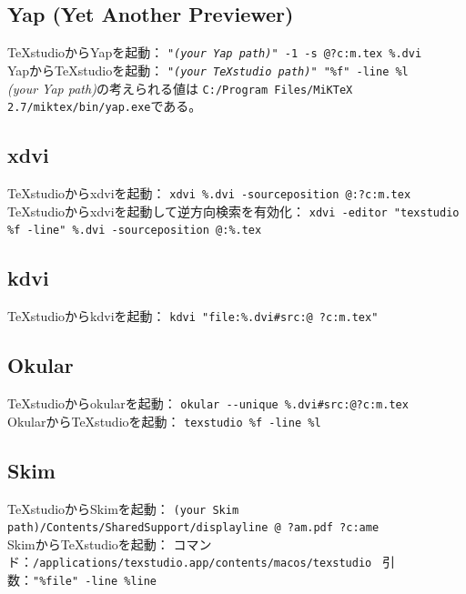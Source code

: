 \subsection{Yap (Yet Another Previewer)}

TeXstudioからYapを起動：
 \texttt{"\emph{(your Yap path)}" -1 -s @?c:m.tex \%.dvi}\\

YapからTeXstudioを起動：
 \texttt{"\emph{(your TeXstudio path)}" "\%f" -line \%l}\\

\emph{(your Yap path)}の考えられる値は
\verb+C:/Program Files/MiKTeX 2.7/miktex/bin/yap.exe+である。

\subsection{xdvi}

TeXstudioからxdviを起動：
 \texttt{xdvi \%.dvi -sourceposition @:?c:m.tex}\\

TeXstudioからxdviを起動して逆方向検索を有効化：
 \texttt{xdvi -editor "texstudio \%f -line" \%.dvi -sourceposition @:\%.tex}

\subsection{kdvi}

TeXstudioからkdviを起動：
 \texttt{kdvi "file:\%.dvi\#src:@ ?c:m.tex"}

\subsection{Okular}

TeXstudioからokularを起動：
 \verb+okular --unique %.dvi#src:@?c:m.tex+\\

OkularからTeXstudioを起動： \verb+texstudio %f -line %l+

\subsection{Skim}

TeXstudioからSkimを起動：
 \texttt{(your Skim path)/Contents/SharedSupport/displayline @ ?am.pdf ?c:ame}\\

SkimからTeXstudioを起動：
コマンド：\verb+/applications/texstudio.app/contents/macos/texstudio+
\ 引数：\verb+"%file" -line %line+\\

